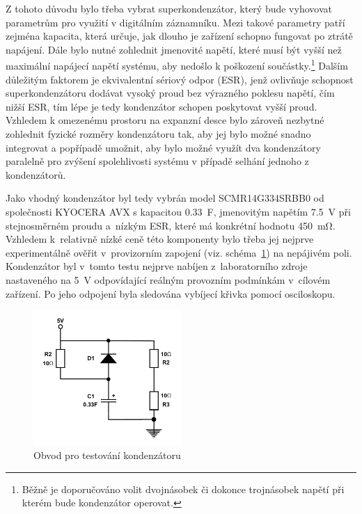 Z tohoto důvodu bylo třeba vybrat superkondenzátor, který bude vyhovovat parametrům pro využití v digitálním záznamníku. Mezi takové parametry patří zejména kapacita, která určuje, jak dlouho je zařízení schopno fungovat po ztrátě napájení. Dále bylo nutné zohlednit jmenovité napětí, které musí být vyšší než maximální napájecí napětí systému, aby nedošlo k poškození součástky.\footnote{Běžně je doporučováno volit dvojnásobek či dokonce trojnásobek napětí při kterém bude kondenzátor operovat.} Dalším důležitým faktorem je ekvivalentní sériový odpor (ESR), jenž ovlivňuje schopnost superkondenzátoru dodávat vysoký proud bez výrazného poklesu napětí, čím nižší ESR, tím lépe je tedy kondenzátor schopen poskytovat vyšší proud. Vzhledem k omezenému prostoru na expanzní desce bylo zároveň nezbytné zohlednit fyzické rozměry kondenzátoru tak, aby jej bylo možné snadno integrovat a popřípadě umožnit, aby bylo možné využít dva kondenzátory paralelně pro zvýšení spolehlivosti systému v případě selhání jednoho z kondenzátorů.

Jako vhodný kondenzátor byl tedy vybrán model SCMR14G334SRBB0 od společnosti KYOCERA AVX s kapacitou \SI{0.33}{\farad}, jmenovitým napětím \SI{7.5}{\volt} při stejnosměrném proudu a~nízkým ESR, které má konkrétní hodnotu \SI{450}{\milli\ohm}. Vzhledem k~relativně nízké ceně této komponenty bylo třeba jej nejprve experimentálně ověřit v~provizorním zapojení (viz. schéma~\ref{fig:test-capacitors}) na nepájivém poli. Kondenzátor byl v~tomto testu nejprve nabíjen z~laboratorního zdroje nastaveného na \SI{5}{\volt} odpovídající reálným provozním podmínkám v~cílovém zařízení. Po jeho odpojení byla sledována vybíjecí křivka pomocí osciloskopu.

\begin{figure}[h]
    \centering
    \includegraphics[width=0.50\textwidth]{obrazky-figures/test_capacitors.pdf}
    
    \caption{Obvod pro testování kondenzátoru}
    \label{fig:test-capacitors}
\end{figure}

